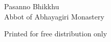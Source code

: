 \documentclass[11pt,a4paper,oneside,showtrims]{memoir}
\newlength\onePageWidth
\newlength\onePageHeight
\begin{document}

\mbox{}

\centering
\color[gray]{0.3}

\vfill

\large

Pasanno Bhikkhu\\
Abbot of Abhayagiri Monastery

\vspace*{1.5\onelineskip}

\normalsize

Printed for free distribution only
\end{document}
